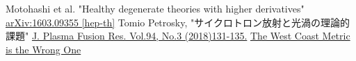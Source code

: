 \documentclass[dvipdfmx, uplatex]{jsarticle}
\begin{document}
\begin{thebibliography}{99}
  Motohashi et al.
  "Healthy degenerate theories with higher derivatives"
  \href{https://arxiv.org/abs/1603.09355}{	arXiv:1603.09355 [hep-th]}
  Tomio Petrosky,
  "サイクロトロン放射と光渦の理論的課題"
  \href{http://www.jspf.or.jp/Journal/PDF_JSPF/jspf2018_03/jspf2018_03-131.pdf}
  {J. Plasma Fusion Res. Vol.94, No.3 (2018)131-135.}
  \href{http://www.math.columbia.edu/~woit/wordpress/?p=7773}
  {The West Coast Metric is the Wrong One}
\end{thebibliography}
\end{document}
